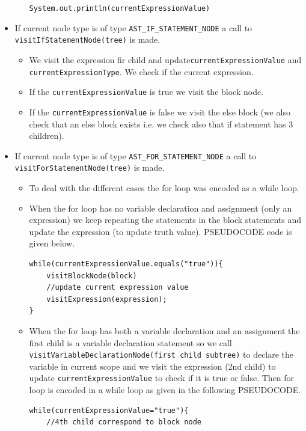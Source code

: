 \begin{itemize}
\begin{itemize}
	      	      \verb!System.out.println(currentExpressionValue)!
	      \end{itemize}
	\item If current node type is of type \verb!AST_IF_STATEMENT_NODE! a call to \verb!visitIfStatementNode(tree)! is made.
	      \begin{itemize}
	      	\item We visit the expression fir child and update\verb!currentExpressionValue! and \verb!currentExpressionType!. We check if the current expression.
	      	\item If the \verb!currentExpressionValue! is true we visit the block node.
	      	\item If the \verb!currentExpressionValue! is false we visit the else block (we also check that an else block exists i.e. we check also that if statement has 3 children). 
	      \end{itemize}
	\item If current node type is of type \verb!AST_FOR_STATEMENT_NODE! a call to \verb!visitForStatementNode(tree)! is made.
	      \begin{itemize}
	      	\item To deal with the different cases the for loop was encoded as a while loop.
	      	\item When the for loop has no variable declaration and assignment (only an expression) we keep repeating the statements in the block statements and update the expression (to update truth value). PSEUDOCODE code is given below.
	      	      \begin{lstlisting}[caption={\emph{for(;expression;)\{...\}} encoded as while loop}]
while(currentExpressionValue.equals("true")){
    visitBlockNode(block)
    //update current expression value
    visitExpression(expression);
}
	      	      \end{lstlisting}
	      	\item When the for loop has both a variable declaration and an assignment the first child is a variable declaration statement so we call \verb!visitVariableDeclarationNode(first child subtree)! to declare the variable in current scope and we visit the expression (2nd child) to update \verb!currentExpressionValue! to check if it is true or false.
	      	      Then for loop is encoded in a while loop as given in the following PSEUDOCODE.
	      	      \begin{lstlisting}[caption=\emph{for(declaration;expression;assignment)\{...\}}]
while(currentExpressionValue="true"){
    //4th child correspond to block node

\end{lstlisting}
\end{itemize}
\end{itemize}

